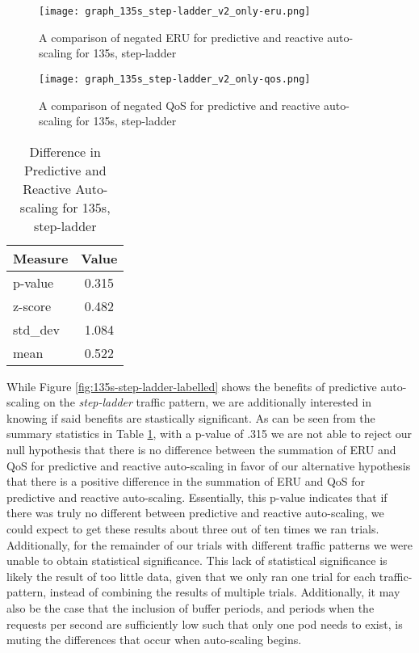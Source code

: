 \begin{figure}[!h]
  \centerline{\texttt{[image: graph\_135s\_step-ladder\_v2\_only-eru.png]}}
  \caption{A comparison of negated ERU for predictive and reactive auto-scaling
  for 135s, step-ladder}
  \label{fig:135s-step-ladder-only-eru}
\end{figure}

\begin{figure}[!h]
  \centerline{\texttt{[image: graph\_135s\_step-ladder\_v2\_only-qos.png]}}
  \caption{A comparison of negated QoS for predictive and reactive auto-scaling
  for 135s, step-ladder}
  \label{fig:135s-step-ladder-only-qos}
\end{figure}

\begin{table}[htbp]
  \centering
  \caption{Difference in Predictive and Reactive Auto-scaling for 135s, step-ladder}
  \label{tab:135s-step-ladder}
\begin{tabular}{l c}\hline\hline
    \multicolumn{1}{c}{\textbf{Measure}} & \textbf{Value} \\ \hline
     p-value & 0.315 \\
     z-score & 0.482 \\
     std\_dev & 1.084 \\
     mean & 0.522
  \end{tabular}
\end{table}


While Figure \ref{fig:135s-step-ladder-labelled} shows the benefits of predictive
auto-scaling on the \textit{step-ladder} traffic pattern,
we are additionally interested in knowing if said benefits are
stastically significant.
As can be seen from the summary statistics in Table \ref{tab:135s-step-ladder},
with a p-value of .315 we are not
able to reject our null hypothesis that there is no difference between the
summation of ERU and QoS for predictive and reactive auto-scaling in favor of
our alternative hypothesis that there is a positive difference in the summation
of ERU and QoS for predictive and reactive auto-scaling. Essentially, this
p-value indicates that if there was truly no different between predictive and
reactive auto-scaling, we could expect to get these results about three out of
ten times we ran trials. Additionally, for the remainder of our trials with
different traffic patterns we were unable to obtain statistical significance.
This lack of statistical significance is likely the result of too little data,
given that we only ran one trial for each traffic-pattern, instead of combining
the results of multiple trials. Additionally, it may also be the case that the
inclusion of buffer periods, and periods when the requests per second are
sufficiently low such that only one pod needs to exist, is muting the
differences that occur when auto-scaling begins.
